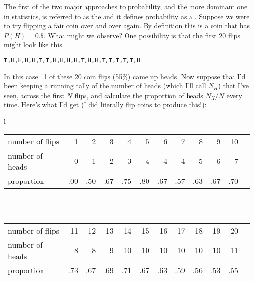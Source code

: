 The first of the two major approaches to probability, and the more dominant one in statistics, is referred to as the  and it defines probability as a . Suppose we were to try flipping a fair coin over and over again. By definition this is a coin that has $P(H) = 0.5$. What might we observe? One possibility is that the first 20 flips might look like this:
\begin{verbatim}
T,H,H,H,H,T,T,H,H,H,H,T,H,H,T,T,T,T,T,H
\end{verbatim}
In this case 11 of these 20 coin flips (55\%) came up heads. Now suppose that I'd been keeping a running tally of the number of heads (which I'll call $N_H$) that I've seen, across the first $N$ flips, and calculate the proportion of heads $N_H / N$ every time. Here's what I'd get (I did literally flip coins to produce this!):
\begin{center}
\begin{tabular}{l}
\begin{tabular}{lrrrrrrrrrrr}
\hline
number of flips &   1 &   2 &   3 &   4 &   5 &   6 &   7 &   8 &   9 &  10 \\
number of heads &   0 &   1 &   2 &   3 &   4 &   4 &   4 &   5 &   6 &   7 \\
\hline
proportion      & .00 & .50 & .67 & .75 & .80 & .67 & .57 & .63 & .67 & .70 \\
\hline
\end{tabular} \\ \vspace*{12pt}
\\
\begin{tabular}{lrrrrrrrrrrr}
\hline
number of flips &  11 &  12 &  13 &  14 &  15 &  16 &  17 &  18 &  19 &  20 \\
number of heads &   8 &   8 &   9 &  10 &  10 &  10 &  10 &  10 &  10 &  11 \\
\hline
proportion      & .73 & .67 & .69 & .71 & .67 & .63 & .59 & .56 & .53 & .55 \\
\hline
\end{tabular}
\end{tabular}
\end{center}

